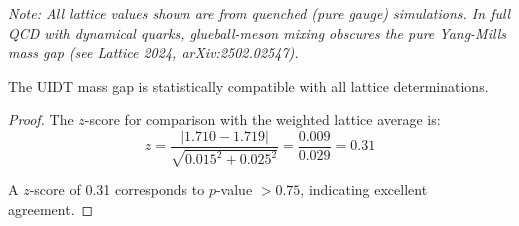 \textit{Note: All lattice values shown are from quenched (pure gauge) simulations. In full QCD with dynamical quarks, glueball-meson mixing obscures the pure Yang-Mills mass gap (see Lattice 2024, arXiv:2502.02547).}
\begin{theorem}

\label{thm:compatibility}
The UIDT mass gap is statistically compatible with all lattice determinations.
\end{theorem}

\begin{proof}
The $z$-score for comparison with the weighted lattice average is:
\begin{equation}
z = \frac{|1.710 - 1.719|}{\sqrt{0.015^2 + 0.025^2}} = \frac{0.009}{0.029} = 0.31
\end{equation}

A $z$-score of 0.31 corresponds to $p$-value $> 0.75$, indicating 
excellent agreement.
\end{proof}

